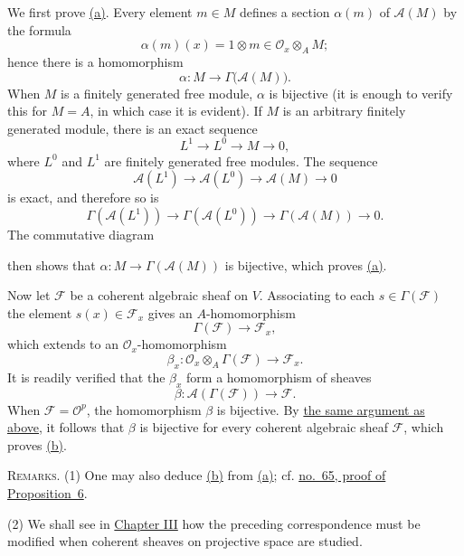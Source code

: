 \label{fac:II:4:thm:1:a:proof}
We first prove \hyperref[fac:II:4:thm:1:a]{(a)}. Every element $m\in M$ defines a section $\alpha(m)$ of
$\mathcal{A}(M)$ by the formula
\[
\alpha(m)(x)=1\otimes m\in\mathcal{O}_x\otimes_A M;
\]
hence there is a homomorphism
\[
\alpha:M\longrightarrow\Gamma\bigl(\mathcal{A}(M)\bigr).
\]
When $M$ is a finitely generated free module, $\alpha$ is bijective (it is
enough to verify this for $M=A$, in which case it is evident). If $M$ is an
arbitrary finitely generated module, there is an exact sequence
\[
L^1\longrightarrow L^0\longrightarrow M\longrightarrow0,
\]
where $L^0$ and $L^1$ are finitely generated free modules. The sequence
\[
\mathcal{A}(L^1)\longrightarrow\mathcal{A}(L^0)
\longrightarrow\mathcal{A}(M)\longrightarrow0
\]
is exact, and therefore so is
\[
\Gamma(\mathcal{A}(L^1))\longrightarrow\Gamma(\mathcal{A}(L^0))
\longrightarrow\Gamma(\mathcal{A}(M))\longrightarrow0.
\]
The commutative diagram
\label{fac:II:4:diagram:1}
\begin{center}
\end{center}
then shows that
$\alpha:M\to\Gamma(\mathcal{A}(M))$ is bijective, which proves \hyperref[fac:II:4:thm:1:a]{(a)}.

Now let $\mathcal{F}$ be a coherent algebraic sheaf on $V$. Associating to
each $s\in\Gamma(\mathcal{F})$ the element $s(x)\in\mathcal{F}_x$ gives an
$A$-homomorphism
\[
\Gamma(\mathcal{F})\longrightarrow\mathcal{F}_x,
\]
which extends to an $\mathcal{O}_x$-homomorphism
\[
\beta_x:\mathcal{O}_x\otimes_A\Gamma(\mathcal{F})
\longrightarrow\mathcal{F}_x.
\]
It is readily verified that the $\beta_x$ form a homomorphism of sheaves
\[
\beta:\mathcal{A}(\Gamma(\mathcal{F}))\longrightarrow\mathcal{F}.
\]
When $\mathcal{F}=\mathcal{O}^p$, the homomorphism $\beta$ is bijective. By
\hyperref[fac:II:4:thm:1:a:proof]{the same argument as above}, it follows that $\beta$ is bijective for every
coherent algebraic sheaf $\mathcal{F}$, which proves \hyperref[fac:II:4:thm:1:b]{(b)}.

\label{fac:II:4:no:49:remark:1}
\textsc{Remarks.} (1) One may also deduce \hyperref[fac:II:4:thm:1:b]{(b)} from \hyperref[fac:II:4:thm:1:a]{(a)}; cf. \hyperref[fac:III:3:no:65:prop:6]{no.~65, proof of
Proposition~6}.

\label{fac:II:4:no:49:remark:2}
(2) We shall see in \hyperref[fac:III]{Chapter III} how the preceding correspondence must be
modified when coherent sheaves on projective space are studied.
